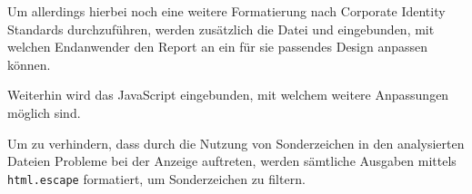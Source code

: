            Um allerdings hierbei noch eine weitere Formatierung nach Corporate Identity Standards durchzuführen,
            werden zusätzlich die Datei
             und
             eingebunden,
            mit welchen Endanwender den Report an ein für sie passendes Design anpassen können.

            Weiterhin wird das JavaScript
             eingebunden,
            mit welchem weitere Anpassungen möglich sind.

            Um zu verhindern,
            dass durch die Nutzung von Sonderzeichen in den analysierten Dateien Probleme bei der Anzeige auftreten,
            werden sämtliche Ausgaben mittels
            \lstinline{html.escape} formatiert,
            um Sonderzeichen zu filtern.
